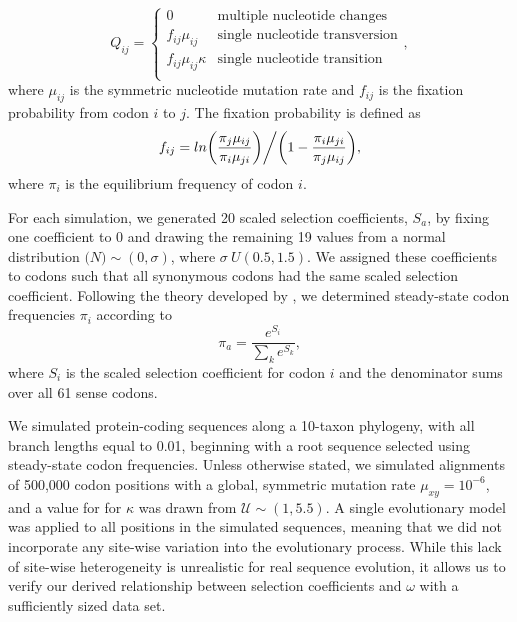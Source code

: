 \documentclass[11pt]{article}
\begin{document}
\begin{equation}
Q_{ij} = \left\{ \begin{array}{rl}
              0                                           &\mbox{multiple nucleotide changes} \\
              f_{ij}\mu_{ij}                          &\mbox{single nucleotide transversion} \\
              f_{ij}\mu_{ij}\kappa               &\mbox{single nucleotide transition} \\
         \end{array} \right.,
\end{equation} where $\mu_{ij}$ is the symmetric nucleotide mutation rate and $f_{ij}$ is the fixation probability from codon $i$ to $j$. The fixation probability is defined as \begin{equation}f_{ij} = ln\bigg{(}\frac{\pi_j\mu_{ij}}{\pi_i\mu_{ji}}\bigg{)}\bigg{/}\bigg{(}1 - \frac{\pi_i\mu_{ji}}{\pi_j\mu_{ij}}\bigg{)},\end{equation} where $\pi_i$ is the equilibrium frequency of codon $i$.

For each simulation, we generated 20 scaled selection coefficients, $S_a$, by fixing one coefficient to 0 and drawing the remaining 19 values from a normal distribution $\mathcal(N)\sim(0,\sigma)$, where $\sigma ~ U(0.5, 1.5)$. We assigned these coefficients to codons such that all synonymous codons had the same scaled selection coefficient. Following the theory developed by \cite{SellaHirsh2005}, we determined steady-state codon frequencies $\pi_i$ according to \begin{equation} \pi_a = \frac{e^{S_i}}{\sum_k e^{S_k}}, \end{equation} where $S_i$ is the scaled selection coefficient for codon $i$ and the denominator sums over all 61 sense codons. 
 
We simulated protein-coding sequences along a 10-taxon phylogeny, with all branch lengths equal to 0.01, beginning with a root sequence selected using steady-state codon frequencies. Unless otherwise stated, we simulated alignments of 500,000 codon positions with a global, symmetric mutation rate $\mu_{xy} = 10^{-6}$, and a value for for $\kappa$ was drawn from $\mathcal{U} \sim (1,5.5)$. A single evolutionary model was applied to all positions in the simulated sequences, meaning that we did not incorporate any site-wise variation into the evolutionary process. While this lack of site-wise heterogeneity is unrealistic for real sequence evolution, it allows us to verify our derived relationship between selection coefficients and $\omega$ with a sufficiently sized data set.
\end{document}
